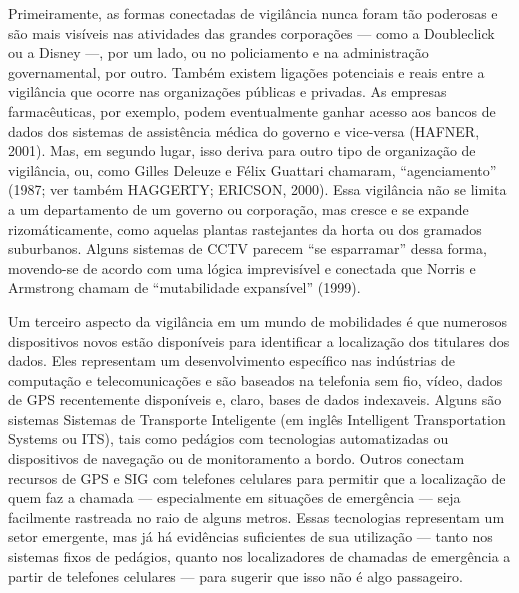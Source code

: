 Primeiramente, as formas conectadas de vigilância nunca foram tão
poderosas e são mais visíveis nas atividades das grandes corporações ---
como a Doubleclick ou a Disney ---, por um lado, ou no policiamento e na
administração governamental, por outro. Também existem ligações
potenciais e reais entre a vigilância que ocorre nas organizações
públicas e privadas. As empresas farmacêuticas, por exemplo, podem
eventualmente ganhar acesso aos bancos de dados dos sistemas de
assistência médica do governo e vice-versa (HAFNER, 2001). Mas, em
segundo lugar, isso deriva para outro tipo de organização de vigilância,
ou, como Gilles Deleuze e Félix Guattari chamaram, ``agenciamento''
(1987; ver também HAGGERTY; ERICSON, 2000). Essa vigilância não se
limita a um departamento de um governo ou corporação, mas cresce e se
expande rizomáticamente, como aquelas plantas rastejantes da horta ou
dos gramados suburbanos. Alguns sistemas de CCTV parecem ``se
esparramar'' dessa forma, movendo-se de acordo com uma lógica
imprevisível e conectada que Norris e Armstrong chamam de ``mutabilidade
expansível'' (1999).

Um terceiro aspecto da vigilância em um mundo de mobilidades é que
numerosos dispositivos novos estão disponíveis para identificar a
localização dos titulares dos dados. Eles representam um desenvolvimento
específico nas indústrias de computação e telecomunicações e são
baseados na telefonia sem fio, vídeo, dados de GPS recentemente
disponíveis e, claro, bases de dados indexaveis. Alguns são sistemas
Sistemas de Transporte Inteligente (em inglês Intelligent Transportation
Systems ou ITS), tais como pedágios com tecnologias automatizadas ou
dispositivos de navegação ou de monitoramento a bordo. Outros conectam
recursos de GPS e SIG com telefones celulares para permitir que a
localização de quem faz a chamada --- especialmente em situações de
emergência --- seja facilmente rastreada no raio de alguns metros. Essas
tecnologias representam um setor emergente, mas já há evidências
suficientes de sua utilização --- tanto nos sistemas fixos de pedágios,
quanto nos localizadores de chamadas de emergência a partir de telefones
celulares --- para sugerir que isso não é algo passageiro.

